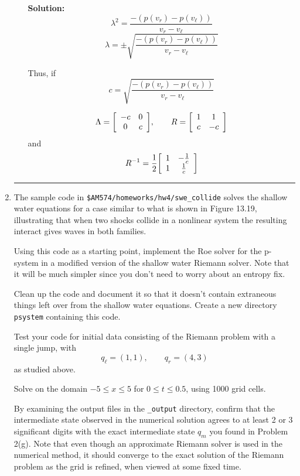 \documentclass[11pt]{article}
\newenvironment{mat}{\left[ \begin{array}{ccccccccccccc}}{\end{array}\right]}
\newcommand\bcm{\begin{mat}}
\newcommand\ecm{\end{mat}}
\begin{document}
\begin{enumerate}
\begin{enumerate}
\vskip 1cm
{\bf Solution:}
\[\lambda^2 = \frac{-(p(v_r)-p(v_\ell))}{v_r - v_\ell}\]
\[\lambda = \pm \sqrt{ \frac{-(p(v_r)-p(v_\ell))}{v_r - v_\ell}}\]

Thus, if 
\[c =   \sqrt{ \frac{-(p(v_r)-p(v_\ell))}{v_r - v_\ell}}\]

\[
\Lambda = \bcm -c&0\\ 0&c\ecm, \qquad R = \bcm 1&1\\c&-c \ecm
\]
 and
\[R^{-1} = \frac{1}{2} \bcm 1 & -\frac{1}{c}  \\ 1 & \frac{1}{c}\ecm\]

\end{enumerate} 



\vskip 1cm
\hrule
\item

The sample code in \verb+$AM574/homeworks/hw4/swe_collide+ solves the
shallow water equations for a case similar to what is shown in Figure 13.19,
illustrating that when two shocks collide in a nonlinear system the
resulting interact gives waves in both families.

Using this code as a starting point, implement the Roe solver for the p-system 
in a modified version of the shallow water Riemann solver.  Note that it
will be much simpler since you don't need to worry about an entropy fix.

Clean up the code and document it so that it doesn't contain extraneous
things left over from the shallow water equations.  Create a new directory
\verb+psystem+ containing this code.

Test your code for initial data consisting of the Riemann problem with a
single jump, with 
\[
q_\ell = (1,1), \qquad q_r = (4,3)
\]
as studied above.  

Solve on the domain $-5 \leq x \leq 5$ for $0\leq t \leq 0.5$,
using 1000 grid cells.  

By examining the output files in the \verb+_output+ directory,
confirm that the intermediate
state observed in the numerical solution agrees to at least 2 or 3
significant digits with the exact intermediate state $q_m$ you found in Problem
2(g).  Note that even though an approximate Riemann solver is used in
the numerical method, it should converge to the exact solution of the
Riemann problem as the grid is refined, when viewed at some fixed time.


\end{enumerate}
\end{document}
